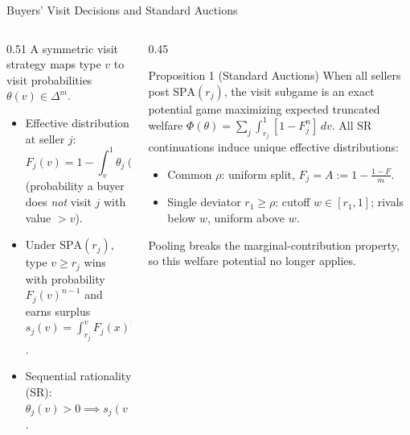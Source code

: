 \documentclass[11pt,aspectratio=169,handout]{beamer}
\def\meditem{\smallskip\item}
\newcommand{\SPA}{\mathrm{SPA}}
\begin{document}
\begin{frame}{Buyers' Visit Decisions and Standard Auctions}
\begin{columns}[T]
\begin{column}{0.51\textwidth}
A symmetric visit strategy maps type $v$ to visit probabilities $\theta(v)\in\Delta^m$.
\begin{itemize}
\item \alert{Effective distribution} at seller $j$:
\[
F_j(v) = 1 - \int_v^1 \theta_j(x)f(x)\,dx
\]
(probability a buyer does \emph{not} visit $j$ with value $>v$).
\meditem Under $\SPA(r_j)$, type $v\ge r_j$ wins with probability $F_j(v)^{n-1}$ and earns surplus $s_j(v)=\int_{r_j}^v F_j(x)^{n-1}\,dx$.
\meditem \alert{Sequential rationality} (SR): $\theta_j(v)>0 \implies s_j(v)=\max_k s_k(v)$.
\end{itemize}
\end{column}
\begin{column}{0.45\textwidth}
\begin{block}{Proposition 1 (Standard Auctions)}
When all sellers post $\SPA(r_j)$, the visit subgame is an exact potential game maximizing expected truncated welfare $\Phi(\theta)=\sum_j\int_{r_j}^1[1-F_j^n]\,dv$. All SR continuations induce unique effective distributions:
\begin{itemize}
\item Common $\rho$: uniform split, $F_j=A:=1-\frac{1-F}{m}$.
\item Single deviator $r_1\ge\rho$: cutoff $w\in[r_1,1]$; rivals below $w$, uniform above $w$.
\end{itemize}
\end{block}
{\footnotesize Pooling breaks the marginal-contribution property, so this welfare potential no longer applies.}
\end{column}
\end{columns}
\end{frame}
\end{document}
